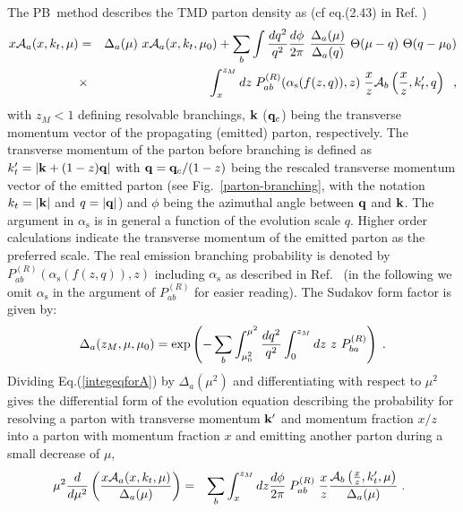 \documentclass[11pt]{article} \usepackage{mystyle-new}
\newcommand{\as}{\ensuremath{\alpha_\mathrm{s}}}
\def\PB{{PB}}
\begin{document}
The \PB\ method describes the TMD parton density as (cf eq.(2.43) in Ref. \cite{Hautmann:2017fcj}) 
\begin{eqnarray}
\label{integeqforA}
  { x{\cal A}}_a(x,k_t, \mu) &=&  \Delta_a (  \mu  ) \  x { {\cal A}}_a(x,k_t,\mu_0)  
 + \sum_b \int {{d q^{ 2} } \over {q^{ 2} } }  {{d \phi  } \over {2 \pi  }}  \  
{
{\Delta_a (  \mu  )} 
 \over 
{\Delta_a (  q  
 ) }
}
\ \Theta(\mu-q) \  
\Theta(q - \mu_0)
 \nonumber\\ 
&\times&  
\int_x^{z_M} {dz} \;
P_{ab}^{(R)} (\as(f(z,q))
,z) 
\;\frac{x}{z} { {\cal A}}_b\left({\frac{x}{z}}, k_t^{\prime} , 
q\right)  
  \;\;  ,     
\end{eqnarray}
with  $z_M<1$ defining resolvable branchings, ${\bf k}$ (${\bf q}_c$) being the transverse momentum vector of the propagating (emitted) parton, respectively.
 The transverse momentum of the parton before branching is defined as 
$k_t^{\prime } = | {\bf k}+(1-z) {\bf q}| $ with  ${\bf q} = {\bf q}_c/(1-z) $ being the rescaled transverse momentum vector of the emitted parton (see Fig.~\ref{parton-branching}, with the notation  $k_t=|{\bf k}|$ and $q=|{\bf q}|$) and $\phi$ being the azimuthal angle between $ {\bf q}$ and ${\bf k}$.
The argument in $\as$ is in general a function of the evolution scale $q$. Higher order calculations indicate the transverse momentum of the emitted parton as the preferred scale. The real emission branching probability is denoted by $P_{ab}^{(R)} (\as(f(z,q)), z)$ including $\as$ as described in Ref.~\cite{Hautmann:2017fcj} (in the following we omit $\as$   in the argument of $ P_{ab}^{(R)}$ for easier reading). 
The Sudakov form factor is given by:  
\begin{equation}
\label{sud-def}
 \Delta_a ( z_M, \mu , \mu_0 ) = 
\exp \left(  -  \sum_b  
\int^{\mu^2}_{\mu^2_0} 
{{dq^{ 2} } 
\over q^{ 2} } 
 \int_0^{z_M} dz \  z 
\ P_{ba}^{(R)} 
\right) 
  \;.
\end{equation}
Dividing Eq.(\ref{integeqforA}) by $\Delta_a (  \mu^2  )$ and differentiating with respect to  ${ \mu^{ 2 } }$  gives the differential form of the evolution equation describing
the probability for resolving a parton with transverse momentum ${\bf k}^\prime$ and momentum fraction $x/z$ into a parton with momentum fraction $x$ and emitting another parton
 during a small decrease of $\mu$, 
\begin{eqnarray}
\label{diffeqforA}
 { \mu^2} \frac{d} {d \mu^2 }
\left( \frac{ { x{\cal A}}_a(x, k_t, \mu) }{ \Delta_a (  \mu )} \right) & =  &
 \sum_b 
\int_x^{z_M} {dz} {{d \phi  } \over {2 \pi  }} \;
P_{ab}^{(R)}
\;\frac{x}{z} \frac{{ {\cal A}}_b\left({\frac{x}{z}}, k_t^{\prime }, 
\mu \right)}  { \Delta_a ( \mu)}   \;. 
  \;\;      
\end{eqnarray}
\end{document}
